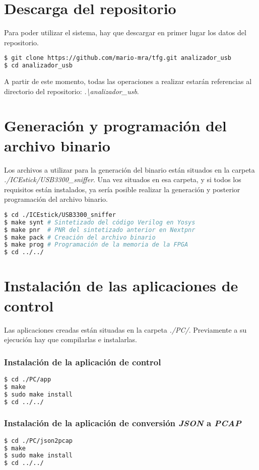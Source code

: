 \section{Descarga del repositorio}
Para poder utilizar el sistema, hay que descargar en primer lugar los datos del repositorio.
\begin{lstlisting}[language=bash]
$ git clone https://github.com/mario-mra/tfg.git analizador_usb
$ cd analizador_usb
\end{lstlisting}
A partir de este momento, todas las operaciones a realizar estarán referencias al directorio del repositorio: \emph{.\textbackslash analizador\_usb}.


\section{Generación y programación del archivo binario}
Los archivos a utilizar para la generación del binario están situados en la carpeta \emph{./ICEstick/USB3300\_sniffer}. Una vez situados en esa carpeta, y si todos los requisitos están instalados, ya sería posible realizar la generación y posterior programación del archivo binario.

\begin{lstlisting}[language=bash]
$ cd ./ICEstick/USB3300_sniffer
$ make synt # Sintetizado del código Verilog en Yosys
$ make pnr  # PNR del sintetizado anterior en Nextpnr
$ make pack # Creación del archivo binario
$ make prog # Programación de la memoria de la FPGA
$ cd ../../
\end{lstlisting}


\section{Instalación de las aplicaciones de control}
Las aplicaciones creadas están situadas en la carpeta \emph{./PC/}. Previamente a su ejecución hay que compilarlas e instalarlas.

\subsubsection{Instalación de la aplicación de control}
\begin{lstlisting}[language=bash]
$ cd ./PC/app
$ make
$ sudo make install
$ cd ../../
\end{lstlisting}

\subsubsection{Instalación de la aplicación de conversión \emph{JSON} a \emph{PCAP}}
\begin{lstlisting}[language=bash]
$ cd ./PC/json2pcap
$ make
$ sudo make install
$ cd ../../
\end{lstlisting}


